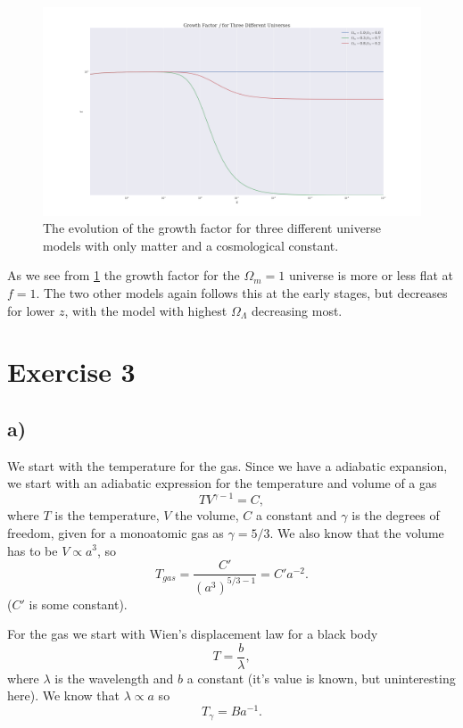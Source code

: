 \documentclass[a4paper,norsk, 10pt]{article}
\begin{document}
\begin{figure}[!h]
\centering
\includegraphics[scale=0.25]{z_v_f}
\caption{The evolution of the growth factor for three different universe models with only matter and a cosmological constant.}\label{fig:z_v_f}
\end{figure}

As we see from \ref{fig:z_v_f} the growth factor for the $\Omega_{m} = 1$ universe is more or less flat at $f = 1$. The two other models again follows this at the early stages, but decreases for lower $z$, with the model with highest $\Omega_{\Lambda}$ decreasing most.

\section{Exercise 3}
\subsection{a)}
We start with the temperature for the gas. Since we have a adiabatic expansion, we start with an adiabatic expression for the temperature and volume of a gas
\begin{equation}
TV^{\gamma - 1} = C,
\end{equation}
where $T$ is the temperature, $V$ the volume, $C$ a constant and $\gamma$ is the degrees of freedom, given for a monoatomic gas as $\gamma = 5/3$. We also know that the volume has to be $V \propto a^{3}$, so
\begin{equation}
T_{gas} = \frac{C'}{(a^3)^{5/3 - 1}} = C'a^{-2}.
\end{equation}
($C'$ is some constant). 

For the gas we start with Wien's displacement law for a black body
\begin{equation}
T = \frac{b}{\lambda},
\end{equation}
where $\lambda$ is the wavelength and $b$ a constant (it's value is known, but uninteresting here). We know that $\lambda \propto a$ so
\begin{equation}
T_{\gamma} = Ba^{-1}.
\end{equation}
\end{document}
